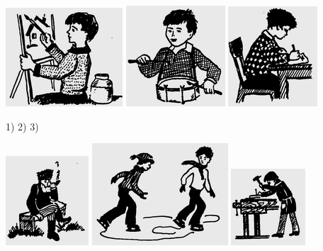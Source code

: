 \documentclass[a5paper]{article}
\begin{document}
 \includegraphics[width=1.7189in,height=1.448in]{images/MuhammadBagauddinprettified-img292.png}   \includegraphics[width=1.4583in,height=1.4791in]{images/MuhammadBagauddinprettified-img293.png}   \includegraphics[width=1.3126in,height=1.4689in]{images/MuhammadBagauddinprettified-img294.png} 

1) 2) 3) 

 \includegraphics[width=1.2189in,height=1.3126in]{images/MuhammadBagauddinprettified-img295.png}   \includegraphics[width=2in,height=1.5in]{images/MuhammadBagauddinprettified-img296.png}   \includegraphics[width=1.0937in,height=1.1252in]{images/MuhammadBagauddinprettified-img297.png} 
\end{document}
